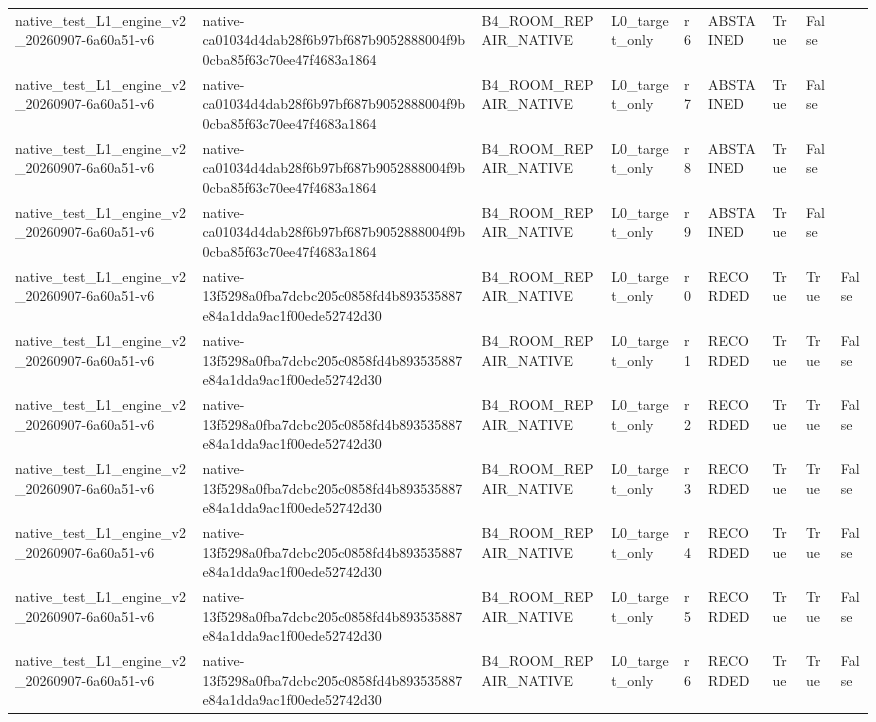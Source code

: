 \begin{tabular}{lllllllll}
native\_test\_L1\_engine\_v2\_20260907-6a60a51-v6 & native-ca01034d4dab28f6b97bf687b9052888004f9b0cba85f63c70ee47f4683a1864 & B4\_ROOM\_REPAIR\_NATIVE & L0\_target\_only & r6 & ABSTAINED & True & False &  \\
native\_test\_L1\_engine\_v2\_20260907-6a60a51-v6 & native-ca01034d4dab28f6b97bf687b9052888004f9b0cba85f63c70ee47f4683a1864 & B4\_ROOM\_REPAIR\_NATIVE & L0\_target\_only & r7 & ABSTAINED & True & False &  \\
native\_test\_L1\_engine\_v2\_20260907-6a60a51-v6 & native-ca01034d4dab28f6b97bf687b9052888004f9b0cba85f63c70ee47f4683a1864 & B4\_ROOM\_REPAIR\_NATIVE & L0\_target\_only & r8 & ABSTAINED & True & False &  \\
native\_test\_L1\_engine\_v2\_20260907-6a60a51-v6 & native-ca01034d4dab28f6b97bf687b9052888004f9b0cba85f63c70ee47f4683a1864 & B4\_ROOM\_REPAIR\_NATIVE & L0\_target\_only & r9 & ABSTAINED & True & False &  \\
native\_test\_L1\_engine\_v2\_20260907-6a60a51-v6 & native-13f5298a0fba7dcbc205c0858fd4b893535887e84a1dda9ac1f00ede52742d30 & B4\_ROOM\_REPAIR\_NATIVE & L0\_target\_only & r0 & RECORDED & True & True & False \\
native\_test\_L1\_engine\_v2\_20260907-6a60a51-v6 & native-13f5298a0fba7dcbc205c0858fd4b893535887e84a1dda9ac1f00ede52742d30 & B4\_ROOM\_REPAIR\_NATIVE & L0\_target\_only & r1 & RECORDED & True & True & False \\
native\_test\_L1\_engine\_v2\_20260907-6a60a51-v6 & native-13f5298a0fba7dcbc205c0858fd4b893535887e84a1dda9ac1f00ede52742d30 & B4\_ROOM\_REPAIR\_NATIVE & L0\_target\_only & r2 & RECORDED & True & True & False \\
native\_test\_L1\_engine\_v2\_20260907-6a60a51-v6 & native-13f5298a0fba7dcbc205c0858fd4b893535887e84a1dda9ac1f00ede52742d30 & B4\_ROOM\_REPAIR\_NATIVE & L0\_target\_only & r3 & RECORDED & True & True & False \\
native\_test\_L1\_engine\_v2\_20260907-6a60a51-v6 & native-13f5298a0fba7dcbc205c0858fd4b893535887e84a1dda9ac1f00ede52742d30 & B4\_ROOM\_REPAIR\_NATIVE & L0\_target\_only & r4 & RECORDED & True & True & False \\
native\_test\_L1\_engine\_v2\_20260907-6a60a51-v6 & native-13f5298a0fba7dcbc205c0858fd4b893535887e84a1dda9ac1f00ede52742d30 & B4\_ROOM\_REPAIR\_NATIVE & L0\_target\_only & r5 & RECORDED & True & True & False \\
native\_test\_L1\_engine\_v2\_20260907-6a60a51-v6 & native-13f5298a0fba7dcbc205c0858fd4b893535887e84a1dda9ac1f00ede52742d30 & B4\_ROOM\_REPAIR\_NATIVE & L0\_target\_only & r6 & RECORDED & True & True & False \\

\end{tabular}
